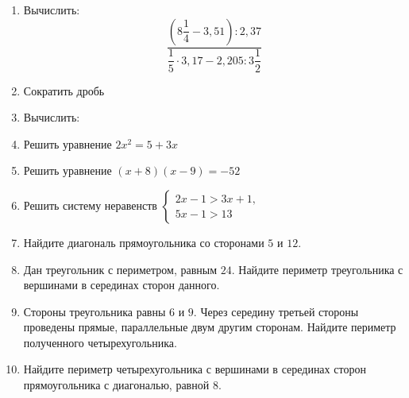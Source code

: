 \documentclass[12pt, a4paper]{article}
\begin{document}
	
	\begin{enumerate}
		\item Вычислить: $$\dfrac{\left(8\dfrac{1}{4}-3,51\right):2,37}{\dfrac{1}{5}\cdot3,17-2,205:3\dfrac{1}{2}}$$
		\item Сократить дробь
		\begin{enumerate}[label=\asbuk*)]
		\end{enumerate}
		\item Вычислить:
		\begin{enumerate}[label=\asbuk*)]
		\end{enumerate}
		\item Решить уравнение $2x^2=5+3x$
		\item Решить уравнение $(x+8)(x-9)=-52$
		\item Решить систему неравенств $\left\{
		\begin{aligned}
			2x-1>3x+1,\\
			5x-1>13
		\end{aligned}
		\right.$
		\item Найдите диагональ прямоугольника со сторонами $5$ и $12$.
		\item Дан треугольник с периметром, равным $24$. Найдите периметр треугольника с вершинами в серединах сторон данного.
		\item Стороны треугольника равны $6$ и $9$. Через середину третьей стороны проведены прямые, параллельные двум другим сторонам. Найдите периметр полученного четырехугольника.
		\item Найдите периметр четырехугольника с вершинами в серединах сторон прямоугольника с диагональю, равной $8$.
	\end{enumerate}
\end{document}
